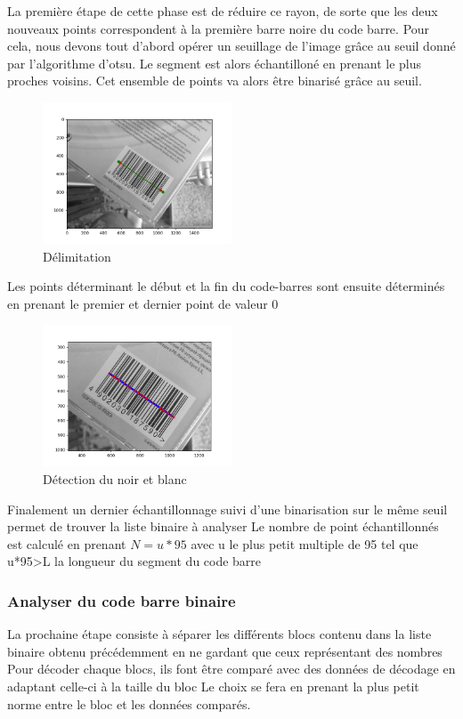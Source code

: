 \documentclass{rapport}
\begin{document}
La première étape de cette phase est de réduire ce rayon, de sorte que les deux nouveaux points correspondent à la première barre noire du code barre.
Pour cela, nous devons tout d'abord opérer un seuillage de l'image grâce au seuil donné par l'algorithme d'otsu.
Le segment est alors échantilloné en prenant le plus proches voisins. 
Cet ensemble de points va alors être binarisé grâce au seuil.

\begin{figure}[H] 
	\centering
	\includegraphics[width=0.5\textwidth]{images/binarisation.png}
	\caption{Délimitation}
	\label{fig:binarisation}
\end{figure}

Les points déterminant le début et la fin du code-barres sont ensuite déterminés en prenant le premier et dernier point de valeur 0


\begin{figure}[H] 
	\centering
	\includegraphics[width=0.5\textwidth]{images/detection.png}
	\caption{Détection du noir et blanc}
	\label{fig:detection}
\end{figure}

Finalement un dernier échantillonnage suivi d'une binarisation sur le même seuil permet de trouver la liste binaire à analyser
Le nombre de point échantillonnés est calculé en prenant $N=u*95$ avec u le plus petit multiple de 95 tel que u*95>L la longueur du segment du code barre

\subsubsection{Analyser du code barre binaire}
La prochaine étape consiste à séparer les différents blocs contenu dans la liste binaire obtenu précédemment en ne gardant que ceux représentant des nombres
Pour décoder chaque blocs, ils font être comparé avec des données de décodage en adaptant celle-ci à la taille du bloc 
Le choix se fera en prenant la plus petit norme entre le bloc et les données comparés. 
\end{document}

